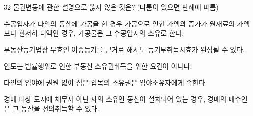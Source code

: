 \begin{question}{32}
물권변동에 관한 설명으로 옳지 않은 것은? (다툼이 있으면 판례에 따름)
\begin{choices}
  \item 수공업자가 타인의 동산에 가공을 한 경우 가공으로 인한 가액의 증가가 원재료의 가액보다 현저히 다액인 경우, 가공물은 그 수공업자의 소유로 한다.
  \item 부동산등기법상 무효인 이중등기를 근거로 해서도 등기부취득시효가 완성될 수 있다.
  \item 인도는 법률행위로 인한 부동산 소유권취득을 위한 요건이 아니다.
  \item 타인의 임야에 권원 없이 심은 입목의 소유권은 임야소유자에게 속한다.
  \item 경매 대상 토지에 채무자 아닌 자의 소유인 동산이 설치되어 있는 경우, 경매의 매수인은 그 동산을 선의취득할 수 있다.
\end{choices}
\end{question}
